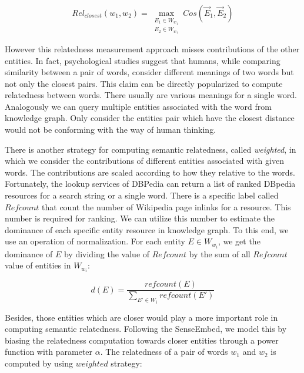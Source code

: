 \begin{small}
    \begin{equation}
        \label{cos}
        \nonumber
        Rel_{closest}(w_1, w_2) = \max \limits_{\substack{E_1 \in W_{w_1} \\ E_2 \in W_{w_1}}}
        Cos(\overrightarrow E_1,\overrightarrow E_2)
    \end{equation}
\end{small}
However this relatedness measurement approach misses contributions of the other entities.
In fact, psychological studies suggest that humans, while comparing similarity between a pair of words, consider
different meanings of two words but not only the closest pairs\cite{Tversky77}. This claim can be directly popularized to compute
relatedness between words. There usually are various meanings for a single word. Analogously we can query multiple
entities associated with the word from knowledge graph. Only consider the entities pair which have the closest distance
would not be conforming with the way of human thinking.

There is another strategy for computing semantic relatedness, called \emph{weighted}, in which
we consider the contributions of different entities associated with given words. The contributions are
scaled according to how they relative to the words. Fortunately, the lookup services of DBPedia can
return a list of ranked DBpedia resources for a search string or a single word. There is a specific label called
$Refcount$ that count the number of Wikipedia page inlinks for a resource. This number is required for ranking.
We can utilize this number to estimate the dominance of each specific entity resource in knowledge graph.
To this end, we use an operation of normalization. For each entity $E \in W_{w_i}$, we get the dominance of
$E$ by dividing the value of $Refcount$ by the sum of all $Refcount$ value of entities in  $W_{w_i}$:

\begin{small}
    \begin{equation}
        \label{cos}
        \nonumber
        d(E) = \frac{refcount(E)}{\sum_{{E}'\in W_i} refcount({E}')}
    \end{equation}
\end{small}

Besides, those entities which are closer would play a more important role in computing semantic relatedness.
Following the SenseEmbed, we model this by biasing the relatedness computation towards closer entities through a power function with
parameter $\alpha$. The relatedness of a pair of words $w_1$ and $w_2$ is computed by using $weighted$ strategy:


